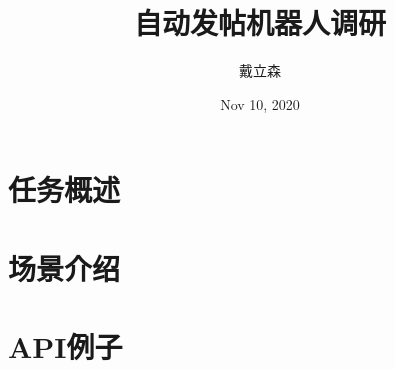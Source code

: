 \documentclass[10pt]{beamer}
\title{
    {自动发帖机器人调研}
}
\author{戴立森}
\date{Nov 10, 2020}
\begin{document}
    \maketitle
    \section*{任务概述}
    
    \section*{场景介绍}
    
    \section*{API例子}
    

        
\end{document}

